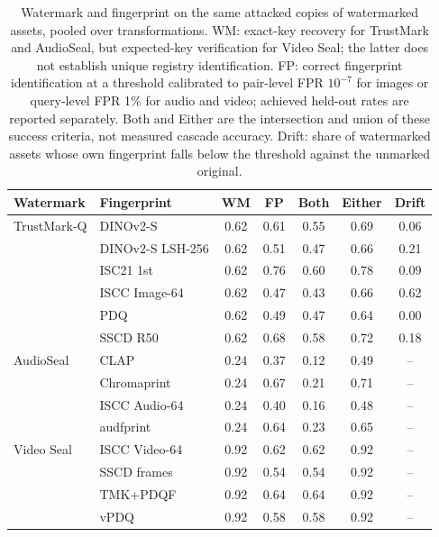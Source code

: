 \begin{table}[!t]
\centering
\footnotesize
\caption{Watermark and fingerprint on the same attacked copies of watermarked assets, pooled over transformations. WM: exact-key recovery for TrustMark and AudioSeal, but expected-key verification for Video Seal; the latter does not establish unique registry identification. FP: correct fingerprint identification at a threshold calibrated to pair-level FPR $10^{-7}$ for images or query-level FPR 1\% for audio and video; achieved held-out rates are reported separately. Both and Either are the intersection and union of these success criteria, not measured cascade accuracy. Drift: share of watermarked assets whose own fingerprint falls below the threshold against the unmarked original.}
\label{tab:fp-wm}
\setlength{\tabcolsep}{3pt}
\begin{tabular}{llccccc}
\toprule
Watermark & Fingerprint & WM & FP & Both & Either & Drift \\
\midrule
TrustMark-Q & DINOv2-S & 0.62 & 0.61 & 0.55 & 0.69 & 0.06 \\
 & DINOv2-S LSH-256 & 0.62 & 0.51 & 0.47 & 0.66 & 0.21 \\
 & ISC21 1st & 0.62 & 0.76 & 0.60 & 0.78 & 0.09 \\
 & ISCC Image-64 & 0.62 & 0.47 & 0.43 & 0.66 & 0.62 \\
 & PDQ & 0.62 & 0.49 & 0.47 & 0.64 & 0.00 \\
 & SSCD R50 & 0.62 & 0.68 & 0.58 & 0.72 & 0.18 \\
\addlinespace
AudioSeal & CLAP & 0.24 & 0.37 & 0.12 & 0.49 & -- \\
 & Chromaprint & 0.24 & 0.67 & 0.21 & 0.71 & -- \\
 & ISCC Audio-64 & 0.24 & 0.40 & 0.16 & 0.48 & -- \\
 & audfprint & 0.24 & 0.64 & 0.23 & 0.65 & -- \\
\addlinespace
Video Seal & ISCC Video-64 & 0.92 & 0.62 & 0.62 & 0.92 & -- \\
 & SSCD frames & 0.92 & 0.54 & 0.54 & 0.92 & -- \\
 & TMK+PDQF & 0.92 & 0.64 & 0.64 & 0.92 & -- \\
 & vPDQ & 0.92 & 0.58 & 0.58 & 0.92 & -- \\
\bottomrule
\end{tabular}

\end{table}
